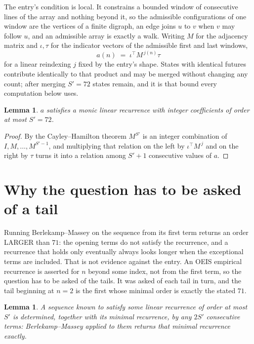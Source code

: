 \documentclass[11pt,a4paper]{article}
\theoremstyle{plain}
\newtheorem{lemma}[theorem]{Lemma}
\theoremstyle{definition}
\begin{document}
The entry's condition is local. It constrains a bounded window of consecutive lines of the
array and nothing beyond it, so the admissible configurations of one window are the vertices of
a finite digraph, an edge joins $u$ to $v$ when $v$ may follow $u$, and an admissible array is
exactly a walk. Writing $M$ for the adjacency matrix and $\iota,\tau$ for the indicator vectors
of the admissible first and last windows,
\[
a(n)\;=\;\iota^{\!\top}M^{\,j(n)}\tau
\]
for a linear reindexing $j$ fixed by the entry's shape. States with identical futures
contribute identically to that product and may be merged without changing any count; after
merging $S'=72$ states remain, and it is that bound every computation below uses.

\begin{lemma}\label{lem:cf}
$a$ satisfies a monic linear recurrence with integer coefficients of order at most $S'=72$.
\end{lemma}

\begin{proof}
By the Cayley--Hamilton theorem $M^{S'}$ is an integer combination of $I,M,\dots,M^{S'-1}$,
and multiplying that relation on the left by $\iota^{\!\top}M^{\,j}$ and on the right by
$\tau$ turns it into a relation among $S'+1$ consecutive values of $a$.
\end{proof}

\section{Why the question has to be asked of a tail}

Running Berlekamp--Massey on the sequence from its first term returns an order LARGER than $71$: the opening terms do not satisfy the recurrence, and a recurrence that holds only eventually always looks longer when the exceptional terms are included. That is not evidence against the entry. An OEIS empirical recurrence is asserted for $n$ beyond some index, not from the first term, so the question has to be asked of the tails. It was asked of each tail in turn, and the tail beginning at $n=2$ is the first whose minimal order is exactly the stated $71$.

\begin{lemma}\label{lem:bm}
A sequence known to satisfy some linear recurrence of order at most $S'$ is determined,
together with its minimal recurrence, by any $2S'$ consecutive terms: Berlekamp--Massey applied
to them returns that minimal recurrence exactly.
\end{lemma}
\end{document}
